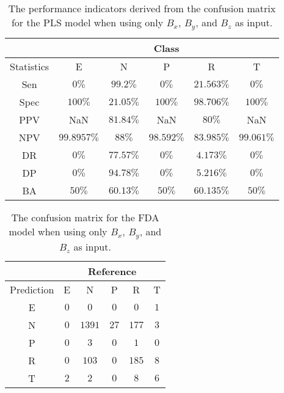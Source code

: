\begin{table}[!ht]
	\centering
	\begin{tabular}{|c|c|c|c|c|c|}
		\hline
		 & \multicolumn{5}{c|}{Class} \\ \hline
		Statistics & E & N & P & R & T \\ \hline
		Sen & $0\%$ & $99.2\%$ & $0\%$ & $21.563\%$ & $0\%$ \\ \hline
		Spec & $100\%$ & $21.05\%$ & $100\%$ & $98.706\%$ & $100\%$ \\ \hline
		PPV & NaN & $81.84\%$ & NaN & $80\%$ & NaN \\ \hline
		NPV & $99.8957\%$ & $88\%$ & $98.592\%$ & $83.985\%$ & $99.061\%$ \\ \hline
		DR & $0\%$ & $77.57\%$ & $0\%$ & $4.173\%$ & $0\%$ \\ \hline
		DP & $0\%$ & $94.78\%$ & $0\%$ & $5.216\%$ & $0\%$ \\ \hline
		BA & $50\%$ & $60.13\%$ & $50\%$ & $60.135\%$ & $50\%$ \\ \hline
	\end{tabular}
	\caption{The performance indicators derived from the confusion matrix for the PLS model when using only $B_{x}$, $B_{y}$, and $B_{z}$ as input.}
	\label{tab:cs:reverse:coord:pls}
\end{table}

\begin{table}[!ht]
	\centering
	\begin{tabular}{|c|c|c|c|c|c|}
		\hline
		 & \multicolumn{5}{|c|}{Reference} \\ \hline
		 Prediction & E & N & P & R & T \\ \hline
		 E & $0$ & $0$ & $0$ & $0$ & $1$ \\ \hline
		 N & $0$ & $1391$ & $27$ & $177$ & $3$ \\ \hline
		 P & $0$ & $3$ & $0$ & $1$ & $0$ \\ \hline
		 R & $0$ & $103$ & $0$ & $185$ & $8$ \\ \hline
		 T & $2$ & $2$ & $0$ & $8$ & $6$ \\ \hline
	\end{tabular}
	\caption{The confusion matrix for the FDA model when using only $B_{x}$, $B_{y}$, and $B_{z}$ as input.}
	\label{tab:cm:coord:fda}
\end{table}


